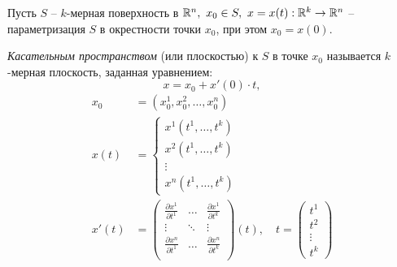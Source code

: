 \begin{definition}
    Пусть $ S $ -- $ k $-мерная поверхность в $ \mathbb{R}^n, \ x_0 \in S, \ x = x(t):\mathbb{R}^k \rightarrow \mathbb{R}^n $ -- параметризация $ S $ в окрестности точки $ x_0 $, при этом $ x_0 = x(0) $.

    \emph{Касательным пространством} (или плоскостью) к $S$ в точке $x_0$ называется $k$-мерная плоскость, заданная уравнением:
    \begin{equation}\label{eq:8}
        x = x_0 + x'(0) \cdot t,
    \end{equation}
    \begin{align*}
        x_0   & = (x^1_0,x^2_0,\ldots,x^n_0)                                                   \\
        x(t)  & = \left\{\begin{array}{l}
                             x^1(t^1,\ldots,t^k) \\
                             x^2(t^1,\ldots,t^k) \\
                             \vdots              \\
                             x^n(t^1,\ldots,t^k)
                         \end{array}\right.                                                   \\
        x'(t) & = \left(\begin{matrix}
                                \frac{\partial x^1}{\partial t^1} & \ldots & \frac{\partial x^1}{\partial t^k} \\
                                \vdots                        & \ddots & \vdots                        \\
                                \frac{\partial x^n}{\partial t^1} & \ldots & \frac{\partial x^n}{\partial t^k} \\
                            \end{matrix}\right)(t), \quad t = \left(\begin{matrix}
                                                                        t^1 \\ t^2 \\ \vdots \\ t^k
                                                                    \end{matrix}\right)
    \end{align*}


\end{definition}
